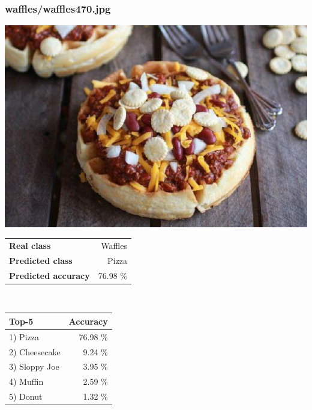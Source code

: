 \subsubsection{waffles/waffles470.jpg}

\begin{minipage}[t]{0.4\textwidth}
	\vspace{0pt}
	\includegraphics[width=\linewidth]{images/evaluation-images/waffles/waffles470.jpg}
\end{minipage}
\hfill
\begin{minipage}[t]{0.5\textwidth}
	\vspace{0pt}\raggedright
	\begin{tabularx}{\textwidth}{X r}
		\small \textbf{Real class} & \small Waffles\\
		\small \textbf{Predicted class} & \small Pizza\\
		\small \textbf{Predicted accuracy} & \small 76.98 \%
    \end{tabularx}\\
    
    \vspace{6pt}
	\begin{tabularx}{\textwidth}{X r}
        \small \textbf{Top-5} & \small \textbf{Accuracy} \\
        \hline
		\small 1) Pizza & \small 76.98 \%\\\small 2) Cheesecake & \small 9.24 \%\\\small 3) Sloppy Joe & \small 3.95 \%\\\small 4) Muffin & \small 2.59 \%\\\small 5) Donut & \small 1.32 \%
    \end{tabularx}
\end{minipage}
    
